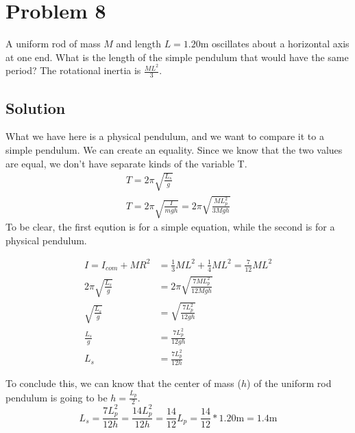 \documentclass[12pt]{article}
\begin{document}
\pagebreak
\section{Problem 8}
A uniform rod of mass $M$ and length $L = 1.20 \unit{\meter}$ oscillates about a horizontal axis at one end. What is the length of the simple pendulum that would have the same period? The rotational inertia is $\frac{ML^2}{3}$.

\subsection{Solution}
What we have here is a physical pendulum, and we want to compare it to a simple pendulum. We can create an equality. Since we know that the two values are equal, we don't have separate kinds of the variable T. 
\begin{gather}
    T   =   2\pi\sqrt{\frac{L_s}{g}}\\
    T   =   2\pi\sqrt{\frac{I}{mgh}}
        =   2\pi\sqrt{\frac{ML_p^2}{3Mgh}}
\end{gather}
To be clear, the first eqution is for a simple equation, while the second is for a physical pendulum.

\begin{align}
    I   =   I_{com} + MR^2
        &=  \frac{1}{3}ML^2 + \frac{1}{4}ML^2
        =   \frac{7}{12}ML^2\\
    2\pi\sqrt{\frac{L_s}{g}}    &=  2\pi\sqrt{\frac{7ML_p^2}{12Mgh}}\\
    \sqrt{\frac{L_s}{g}}  &=  \sqrt{\frac{7L_p^2}{12gh}}\\
    \frac{L_s}{g}   &=  \frac{7L_p^2}{12gh}\\
    L_s &=  \frac{7L_p^2}{12h}
\end{align}

To conclude this, we can know that the center of mass ($h$) of the uniform rod pendulum is going to be \(h = \frac{L_p}{2}\).
\begin{equation}
    L_s =   \frac{7L_p^2}{12h}
        =   \frac{14L_p^2}{12h}
        =   \frac{14}{12}L_p
        =   \frac{14}{12}*1.20\unit{\meter}
        =   \boxed{1.4\unit{\meter}}
\end{equation}
\end{document}
